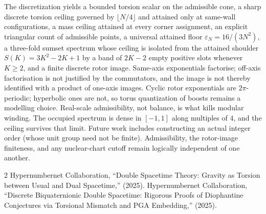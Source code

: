 \documentclass[a4paper]{article}
\theoremstyle{definition}
\begin{document}
The discretization yields a bounded torsion scalar on the admissible cone, a sharp discrete torsion ceiling governed by $\lfloor N/4\rfloor$ and attained only at same-wall configurations, a mass ceiling attained at every corner assignment, an explicit triangular count of admissible points, a universal attained floor $\varepsilon_N=16/(3N^2)$, a three-fold sumset spectrum whose ceiling is isolated from the attained shoulder $S(K)=3K^2-2K+1$ by a band of $2K-2$ empty positive slots whenever $K\ge 2$, and a finite discrete rotor image. Same-axis exponentials factorise; off-axis factorisation is not justified by the commutators, and the image is not thereby identified with a product of one-axis images. Cyclic rotor exponentials are $2\pi$-periodic; hyperbolic ones are not, so torus quantization of boosts remains a modelling choice. Real-scale admissibility, not balance, is what kills modular winding. The occupied spectrum is dense in $[-1,1]$ along multiples of $4$, and the ceiling survives that limit. Future work includes constructing an actual integer order (whose unit group need not be finite). Admissibility, the rotor-image finiteness, and any nuclear-chart cutoff remain logically independent of one another.


\begin{thebibliography}{2}
Hypernumbernet Collaboration, ``Double Spacetime Theory: Gravity as Torsion between Usual and Dual Spacetime,'' (2025).
Hypernumbernet Collaboration, ``Discrete Biquaternionic Double Spacetime: Rigorous Proofs of Diophantine Conjectures via Torsional Mismatch and PGA Embedding,'' (2025).
\end{thebibliography}
\end{document}
